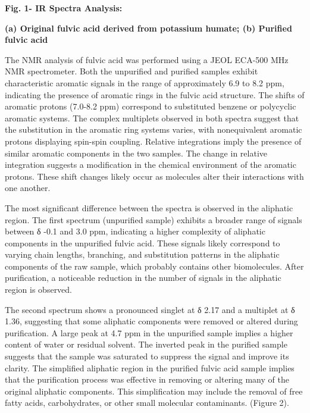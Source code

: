 {\bfseries Fig. 1- IR Spectra Analysis:}

{\bfseries (a) Original fulvic acid derived from potassium humate; (b)
Purified fulvic acid}

The NMR analysis of fulvic acid was performed using a JEOL ECA-500 MHz
NMR spectrometer. Both the unpurified and purified samples exhibit
characteristic aromatic signals in the range of approximately 6.9 to 8.2
ppm, indicating the presence of aromatic rings in the fulvic acid
structure. The shifts of aromatic protons (7.0-8.2 ppm) correspond to
substituted benzene or polycyclic aromatic systems. The complex
multiplets observed in both spectra suggest that the substitution in the
aromatic ring systems varies, with nonequivalent aromatic protons
displaying spin-spin coupling. Relative integrations imply the presence
of similar aromatic components in the two samples. The change in
relative integration suggests a modification in the chemical environment
of the aromatic protons. These shift changes likely occur as molecules
alter their interactions with one another.

The most significant difference between the spectra is observed in the
aliphatic region. The first spectrum (unpurified sample) exhibits a
broader range of signals between δ -0.1 and 3.0 ppm, indicating a higher
complexity of aliphatic components in the unpurified fulvic acid. These
signals likely correspond to varying chain lengths, branching, and
substitution patterns in the aliphatic components of the raw sample,
which probably contains other biomolecules. After purification, a
noticeable reduction in the number of signals in the aliphatic region is
observed.

The second spectrum shows a pronounced singlet at δ 2.17 and a multiplet
at δ 1.36, suggesting that some aliphatic components were removed or
altered during purification. A large peak at 4.7 ppm in the unpurified
sample implies a higher content of water or residual solvent. The
inverted peak in the purified sample suggests that the sample was
saturated to suppress the signal and improve its clarity. The simplified
aliphatic region in the purified fulvic acid sample implies that the
purification process was effective in removing or altering many of the
original aliphatic components. This simplification may include the
removal of free fatty acids, carbohydrates, or other small molecular
contaminants. (Figure 2).


